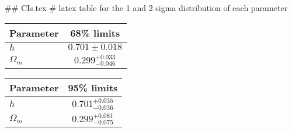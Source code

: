 ## CIs.tex
# latex table for the 1 and 2 sigma distribution of each parameter

\begin{tabular} { l  c}
 Parameter &  68\% limits\\
\hline
{\boldmath$h              $} & $0.701\pm 0.018            $\\
{\boldmath$\Omega_m       $} & $0.299^{+0.033}_{-0.046}   $\\
\hline
\end{tabular}

\begin{tabular} { l  c}
 Parameter &  95\% limits\\
\hline
{\boldmath$h              $} & $0.701^{+0.035}_{-0.036}   $\\
{\boldmath$\Omega_m       $} & $0.299^{+0.081}_{-0.075}   $\\
\hline
\end{tabular}
